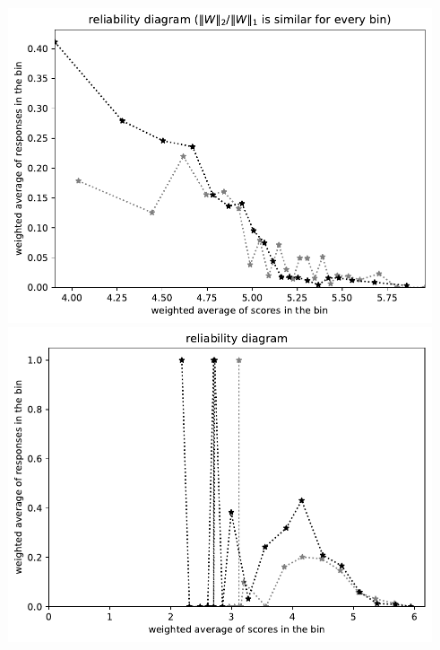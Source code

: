 \documentclass{article}
\newlength{\vertsep}
\newlength{\imsize}
\begin{document}
\begin{figure}
\begin{centering}
\parbox{\imsize}{\includegraphics[width=\imsize]
{../codes/weighted/County_of_San_Francisco_vs_San_Mateo-LNGI/equierrs20.pdf}}
\quad\quad
\parbox{\imsize}{\includegraphics[width=\imsize]
{../codes/weighted/County_of_San_Francisco_vs_San_Mateo-LNGI/equiscores20.pdf}}

\vspace{\vertsep}


\end{centering}
\end{figure}
\end{document}
